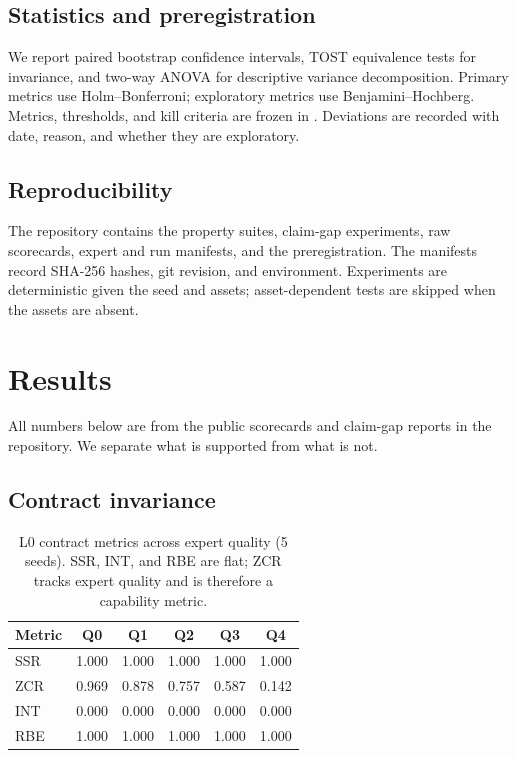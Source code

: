 \documentclass[10pt]{article}
\begin{document}
\subsection{Statistics and preregistration}

We report paired bootstrap confidence intervals, TOST equivalence tests for
invariance, and two-way ANOVA for descriptive variance decomposition. Primary
metrics use Holm--Bonferroni; exploratory metrics use Benjamini--Hochberg.
Metrics, thresholds, and kill criteria are frozen in
. Deviations are recorded with date,
reason, and whether they are exploratory.

\subsection{Reproducibility}

The repository contains the property suites, claim-gap experiments, raw
scorecards, expert and run manifests, and the preregistration. The manifests
record SHA-256 hashes, git revision, and environment. Experiments are
deterministic given the seed and assets; asset-dependent tests are skipped when
the assets are absent.

\section{Results}
\label{sec:results}

All numbers below are from the public scorecards and claim-gap reports in the
repository. We separate what is supported from what is not.

\subsection{Contract invariance}

\begin{table}[t]
\centering
\small
\begin{tabular}{@{}lccccc@{}}
\toprule
Metric & Q0 & Q1 & Q2 & Q3 & Q4 \\
\midrule
SSR & 1.000 & 1.000 & 1.000 & 1.000 & 1.000 \\
ZCR & 0.969 & 0.878 & 0.757 & 0.587 & 0.142 \\
INT & 0.000 & 0.000 & 0.000 & 0.000 & 0.000 \\
RBE & 1.000 & 1.000 & 1.000 & 1.000 & 1.000 \\
\bottomrule
\end{tabular}
\caption{L0 contract metrics across expert quality (5 seeds). SSR, INT, and RBE
are flat; ZCR tracks expert quality and is therefore a capability metric.}
\label{tab:contract}
\end{table}
\end{document}
